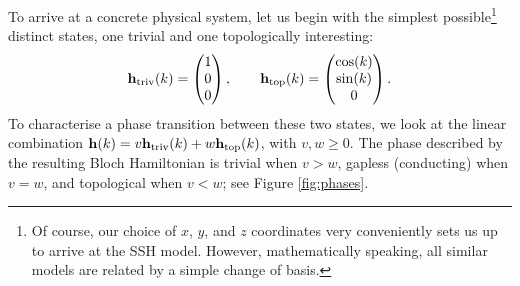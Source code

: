 To arrive at a concrete physical system, let us begin with the simplest possible\footnote{Of course, our choice of $x$, $y$, and $z$ coordinates very conveniently sets us up to arrive at the SSH model. However, mathematically speaking, all similar models are related by a simple change of basis.}
distinct states, one trivial and one topologically interesting:
\[
	\vb{h}_{\rm triv}(k) = \begin{pmatrix}
		1 \\ 0 \\ 0
	\end{pmatrix},\qquad \vb{h}_{\rm top}(k) = \begin{pmatrix}
		\cos(k) \\ \sin(k) \\ 0
	\end{pmatrix}.
\]
To characterise a phase transition between these two states, we look at the linear combination $\vb{h}(k) = v\vb{h}_{\rm triv}(k) + w\vb{h}_{\rm top}(k)$, with $v,w\geq0$. The phase described by the resulting Bloch Hamiltonian is trivial when $v>w$, gapless (conducting) when $v=w$, and topological when $v<w$; see Figure \ref{fig:phases}.
